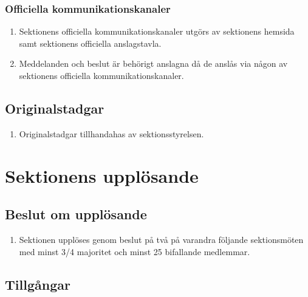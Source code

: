 \documentclass[11pt,a4paper]{article}
\begin{document}
\subsubsection{Officiella kommunikationskanaler}

\begin{enumerate}[\thesubsection .1]

  \item Sektionens officiella kommunikationskanaler utgörs av sektionens hemsida samt sektionens officiella
  anslagstavla.

  \item Meddelanden och beslut är behörigt anslagna då de anslås 
  via någon av sektionens officiella kommunikationskanaler.

\end{enumerate}


\subsection{Originalstadgar}

\begin{enumerate}[\thesubsection .1]

  \item Originalstadgar tillhandahas av sektionsstyrelsen.

\end{enumerate}



\section{Sektionens upplösande}

\subsection{Beslut om upplösande}

\begin{enumerate}[\thesubsection .1]

  \item Sektionen upplöses genom beslut på två på varandra följande
  sektionsmöten med minst 3/4 majoritet och minst 25 bifallande
  medlemmar.

\end{enumerate}

\subsection{Tillgångar}
\end{document}
